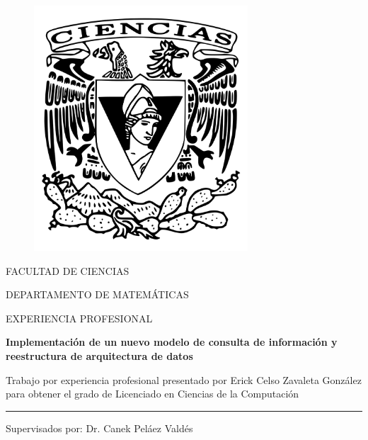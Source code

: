 \begin{titlepage}

  \begin{center}

    \vspace*{-1in}
    \begin{figure}[htb]
      \begin{center}
        \includegraphics[width=8cm]{ciencias2}
      \end{center}
    \end{figure}

    FACULTAD DE CIENCIAS

    \vspace*{0.15in}

    DEPARTAMENTO DE MATEMÁTICAS

    \vspace*{0.6in}

    \begin{large}
      EXPERIENCIA PROFESIONAL
    \end{large}

    \vspace*{0.2in}

    \begin{Large}
      \textbf{Implementación de un nuevo modelo de consulta de información y
        reestructura de arquitectura de datos}
    \end{Large}

    \vspace*{0.3in}

    \begin{large}
      Trabajo por experiencia profesional presentado por Erick Celso Zavaleta
      González para obtener el grado de Licenciado en Ciencias de la Computación
    \end{large}

    \vspace*{0.3in}
    \rule{80mm}{0.1mm}
    \vspace*{0.1in}

    \begin{large}
      Supervisados por: Dr. Canek Peláez Valdés
    \end{large}

  \end{center}

\end{titlepage}

